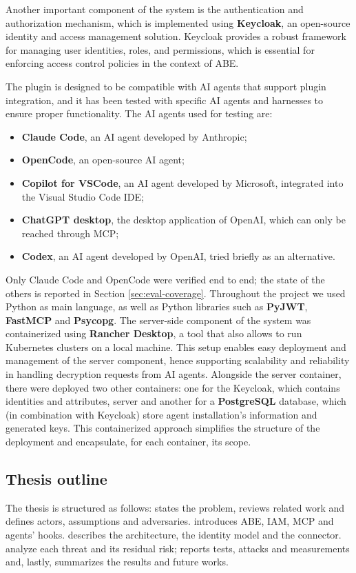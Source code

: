 Another important component of the system is the authentication and authorization mechanism, which is implemented using \textbf{Keycloak}, an open-source identity and access management solution. Keycloak provides a robust framework for managing user identities, roles, and permissions, which is essential for enforcing access control policies in the context of ABE.

The plugin is designed to be compatible with AI agents that support plugin integration, and it has been tested with specific AI agents and harnesses to ensure proper functionality.
The AI agents used for testing are:
\begin{itemize}
    \item \textbf{Claude Code}, an AI agent developed by Anthropic;
    \item \textbf{OpenCode}, an open-source AI agent;
    \item \textbf{Copilot for VSCode}, an AI agent developed by Microsoft, integrated into the Visual Studio Code IDE;
    \item \textbf{ChatGPT desktop}, the desktop application of OpenAI, which can only be reached through MCP;
    \item \textbf{Codex}, an AI agent developed by OpenAI, tried briefly as an alternative.
\end{itemize}
Only Claude Code and OpenCode were verified end to end; the state of the others is reported in Section \ref{sec:eval-coverage}.
Throughout the project we used Python as main language, as well as Python libraries such as \textbf{PyJWT}, \textbf{FastMCP} and \textbf{Psycopg}.
The server-side component of the system was containerized using \textbf{Rancher Desktop}, a tool that also allows to run Kubernetes clusters on a local machine. This setup enables easy deployment and management of the server component, hence supporting scalability and reliability in handling decryption requests from AI agents.
Alongside the server container, there were deployed two other containers: one for the Keycloak, which contains identities and attributes, server and another for a \textbf{PostgreSQL} database, which (in combination with Keycloak) store agent installation's information and generated keys. This containerized approach simplifies the structure of the deployment and encapsulate, for each container, its scope.

\subsection{Thesis outline}
The thesis is structured as follows:
 states the problem, reviews related work and defines actors, assumptions and adversaries.
 introduces ABE, IAM, MCP and agents' hooks.
 describes the architecture, the identity model and the connector.
 analyze each threat and its residual risk;
 reports tests, attacks and measurements and, lastly,
 summarizes the results and future works.
